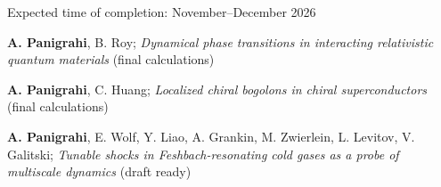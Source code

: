 

\begin{cventries}

  \cventry
    {Expected time of completion: November--December 2026} %
    {} %
    {} %
    {} %
    {
	  \begin{cvitems} %
	  	\item{\textbf{A. Panigrahi}, B. Roy; \textit{Dynamical phase transitions in interacting relativistic quantum materials} (final calculations)}
	  	\item{\textbf{A. Panigrahi}, C. Huang; \textit{Localized chiral bogolons in chiral superconductors} (final calculations)}
	  	\item{\textbf{A. Panigrahi}, E. Wolf, Y. Liao, A. Grankin, M. Zwierlein, L. Levitov, V. Galitski; \textit{Tunable shocks in Feshbach-resonating cold gases as a probe of multiscale dynamics} (draft ready)}
      \end{cvitems}
    }


\end{cventries}
